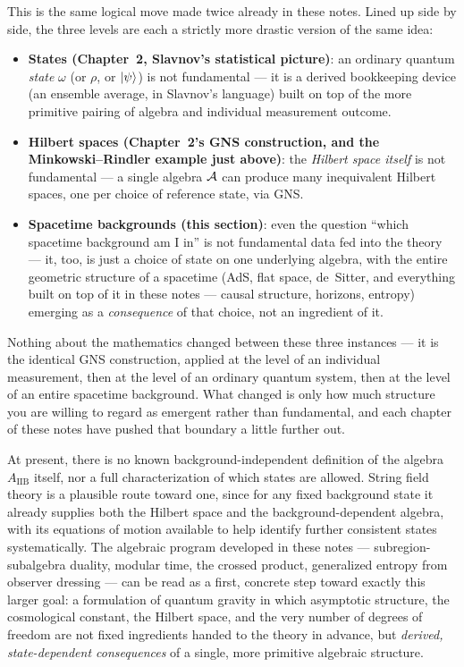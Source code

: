 \begin{physconnect}
This is the same logical move made twice already in these notes. Lined up side by side, the three levels are
each a strictly more drastic version of the same idea:
\begin{itemize}
\item \textbf{States (Chapter~2, Slavnov's statistical picture)}: an ordinary quantum \emph{state} $\omega$
(or $\rho$, or $\ket\psi$) is not fundamental — it is a derived bookkeeping device (an ensemble average, in
Slavnov's language) built on top of the more primitive pairing of algebra and individual measurement outcome.
\item \textbf{Hilbert spaces (Chapter~2's GNS construction, and the Minkowski--Rindler example just above)}:
the \emph{Hilbert space itself} is not fundamental — a single algebra $\mathcal{A}$ can produce many inequivalent
Hilbert spaces, one per choice of reference state, via GNS.
\item \textbf{Spacetime backgrounds (this section)}: even the question ``which spacetime background am I in''
is not fundamental data fed into the theory — it, too, is just a choice of state on one underlying algebra,
with the entire geometric structure of a spacetime (AdS, flat space, de~Sitter, and everything built on top of
it in these notes — causal structure, horizons, entropy) emerging as a \emph{consequence} of that choice, not an
ingredient of it.
\end{itemize}
Nothing about the mathematics changed between these three instances — it is the identical GNS construction,
applied at the level of an individual measurement, then at the level of an ordinary quantum system, then at
the level of an entire spacetime background. What changed is only how much structure you are willing to
regard as emergent rather than fundamental, and each chapter of these notes have pushed that boundary a little
further out.
\end{physconnect}

At present, there is no known background-independent definition of the algebra $A_{\text{IIB}}$ itself, nor a
full characterization of which states are allowed. String field theory is a plausible route toward one, since
for any fixed background state it already supplies both the Hilbert space and the background-dependent
algebra, with its equations of motion available to help identify further consistent states systematically.
The algebraic program developed in these notes — subregion-subalgebra duality, modular time, the crossed
product, generalized entropy from observer dressing — can be read as a first, concrete step toward exactly
this larger goal: a formulation of quantum gravity in which asymptotic structure, the cosmological constant,
the Hilbert space, and the very number of degrees of freedom are not fixed ingredients handed to the theory in
advance, but \emph{derived, state-dependent consequences} of a single, more primitive algebraic structure.

